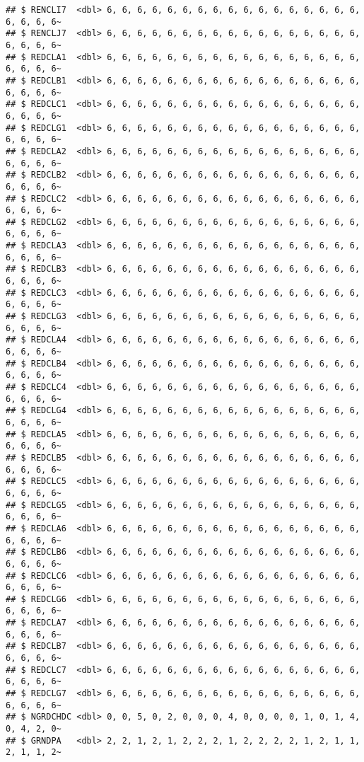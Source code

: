 \documentclass[
]{article}
\begin{document}
\begin{verbatim}
## $ RENCLI7  <dbl> 6, 6, 6, 6, 6, 6, 6, 6, 6, 6, 6, 6, 6, 6, 6, 6, 6, 6, 6, 6, 6~
## $ RENCLJ7  <dbl> 6, 6, 6, 6, 6, 6, 6, 6, 6, 6, 6, 6, 6, 6, 6, 6, 6, 6, 6, 6, 6~
## $ REDCLA1  <dbl> 6, 6, 6, 6, 6, 6, 6, 6, 6, 6, 6, 6, 6, 6, 6, 6, 6, 6, 6, 6, 6~
## $ REDCLB1  <dbl> 6, 6, 6, 6, 6, 6, 6, 6, 6, 6, 6, 6, 6, 6, 6, 6, 6, 6, 6, 6, 6~
## $ REDCLC1  <dbl> 6, 6, 6, 6, 6, 6, 6, 6, 6, 6, 6, 6, 6, 6, 6, 6, 6, 6, 6, 6, 6~
## $ REDCLG1  <dbl> 6, 6, 6, 6, 6, 6, 6, 6, 6, 6, 6, 6, 6, 6, 6, 6, 6, 6, 6, 6, 6~
## $ REDCLA2  <dbl> 6, 6, 6, 6, 6, 6, 6, 6, 6, 6, 6, 6, 6, 6, 6, 6, 6, 6, 6, 6, 6~
## $ REDCLB2  <dbl> 6, 6, 6, 6, 6, 6, 6, 6, 6, 6, 6, 6, 6, 6, 6, 6, 6, 6, 6, 6, 6~
## $ REDCLC2  <dbl> 6, 6, 6, 6, 6, 6, 6, 6, 6, 6, 6, 6, 6, 6, 6, 6, 6, 6, 6, 6, 6~
## $ REDCLG2  <dbl> 6, 6, 6, 6, 6, 6, 6, 6, 6, 6, 6, 6, 6, 6, 6, 6, 6, 6, 6, 6, 6~
## $ REDCLA3  <dbl> 6, 6, 6, 6, 6, 6, 6, 6, 6, 6, 6, 6, 6, 6, 6, 6, 6, 6, 6, 6, 6~
## $ REDCLB3  <dbl> 6, 6, 6, 6, 6, 6, 6, 6, 6, 6, 6, 6, 6, 6, 6, 6, 6, 6, 6, 6, 6~
## $ REDCLC3  <dbl> 6, 6, 6, 6, 6, 6, 6, 6, 6, 6, 6, 6, 6, 6, 6, 6, 6, 6, 6, 6, 6~
## $ REDCLG3  <dbl> 6, 6, 6, 6, 6, 6, 6, 6, 6, 6, 6, 6, 6, 6, 6, 6, 6, 6, 6, 6, 6~
## $ REDCLA4  <dbl> 6, 6, 6, 6, 6, 6, 6, 6, 6, 6, 6, 6, 6, 6, 6, 6, 6, 6, 6, 6, 6~
## $ REDCLB4  <dbl> 6, 6, 6, 6, 6, 6, 6, 6, 6, 6, 6, 6, 6, 6, 6, 6, 6, 6, 6, 6, 6~
## $ REDCLC4  <dbl> 6, 6, 6, 6, 6, 6, 6, 6, 6, 6, 6, 6, 6, 6, 6, 6, 6, 6, 6, 6, 6~
## $ REDCLG4  <dbl> 6, 6, 6, 6, 6, 6, 6, 6, 6, 6, 6, 6, 6, 6, 6, 6, 6, 6, 6, 6, 6~
## $ REDCLA5  <dbl> 6, 6, 6, 6, 6, 6, 6, 6, 6, 6, 6, 6, 6, 6, 6, 6, 6, 6, 6, 6, 6~
## $ REDCLB5  <dbl> 6, 6, 6, 6, 6, 6, 6, 6, 6, 6, 6, 6, 6, 6, 6, 6, 6, 6, 6, 6, 6~
## $ REDCLC5  <dbl> 6, 6, 6, 6, 6, 6, 6, 6, 6, 6, 6, 6, 6, 6, 6, 6, 6, 6, 6, 6, 6~
## $ REDCLG5  <dbl> 6, 6, 6, 6, 6, 6, 6, 6, 6, 6, 6, 6, 6, 6, 6, 6, 6, 6, 6, 6, 6~
## $ REDCLA6  <dbl> 6, 6, 6, 6, 6, 6, 6, 6, 6, 6, 6, 6, 6, 6, 6, 6, 6, 6, 6, 6, 6~
## $ REDCLB6  <dbl> 6, 6, 6, 6, 6, 6, 6, 6, 6, 6, 6, 6, 6, 6, 6, 6, 6, 6, 6, 6, 6~
## $ REDCLC6  <dbl> 6, 6, 6, 6, 6, 6, 6, 6, 6, 6, 6, 6, 6, 6, 6, 6, 6, 6, 6, 6, 6~
## $ REDCLG6  <dbl> 6, 6, 6, 6, 6, 6, 6, 6, 6, 6, 6, 6, 6, 6, 6, 6, 6, 6, 6, 6, 6~
## $ REDCLA7  <dbl> 6, 6, 6, 6, 6, 6, 6, 6, 6, 6, 6, 6, 6, 6, 6, 6, 6, 6, 6, 6, 6~
## $ REDCLB7  <dbl> 6, 6, 6, 6, 6, 6, 6, 6, 6, 6, 6, 6, 6, 6, 6, 6, 6, 6, 6, 6, 6~
## $ REDCLC7  <dbl> 6, 6, 6, 6, 6, 6, 6, 6, 6, 6, 6, 6, 6, 6, 6, 6, 6, 6, 6, 6, 6~
## $ REDCLG7  <dbl> 6, 6, 6, 6, 6, 6, 6, 6, 6, 6, 6, 6, 6, 6, 6, 6, 6, 6, 6, 6, 6~
## $ NGRDCHDC <dbl> 0, 0, 5, 0, 2, 0, 0, 0, 4, 0, 0, 0, 0, 1, 0, 1, 4, 0, 4, 2, 0~
## $ GRNDPA   <dbl> 2, 2, 1, 2, 1, 2, 2, 2, 1, 2, 2, 2, 2, 1, 2, 1, 1, 2, 1, 1, 2~

\end{verbatim}
\end{document}
